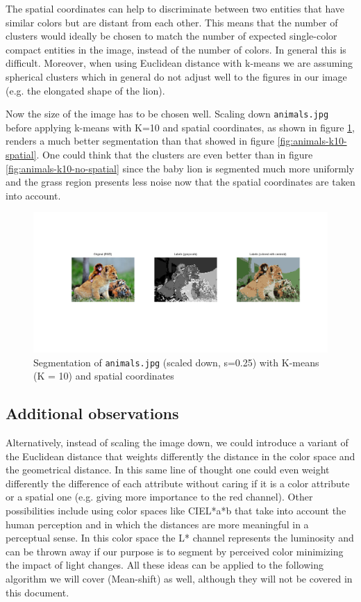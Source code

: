 The spatial coordinates can help to discriminate between two entities
that have similar colors but are distant from each other. This means that the number of
clusters would ideally be chosen to match the number of expected single-color compact
entities in the image, instead
of the number of colors. In general this is difficult.
Moreover, when using Euclidean distance with k-means
we are assuming spherical clusters which in general do not adjust well to the figures in
our image (e.g. the elongated shape of the lion).

Now the size of the image has to be chosen well. Scaling
down \texttt{animals.jpg} before applying k-means with K=10 and spatial coordinates,
as shown in figure
\ref{fig:animals-k10-spatial-scaled-down},
renders a much better segmentation than that showed in figure \ref{fig:animals-k10-spatial}.
One could think
that the clusters are even better than in figure \ref{fig:animals-k10-no-spatial} since
the baby lion is segmented much more uniformly and the grass region presents less noise now
that the spatial coordinates are taken into account.

\begin{figure}[hbt]
\centering
\includegraphics[trim={50px 150px 50px 125px},clip,width=\textwidth]{img/kmeans/animals_k10_scaled_down_spatial.png}
\caption{Segmentation of \texttt{animals.jpg} (scaled down, s=0.25) with K-means (K = 10) and spatial coordinates}
\label{fig:animals-k10-spatial-scaled-down}
\end{figure}

\subsection{Additional observations}

Alternatively, instead of scaling the image down, we could introduce a
variant of the Euclidean distance that weights differently the distance
in the color space and the geometrical distance. In this same line of thought one
could even weight differently the difference of each attribute without caring if
it is a color attribute or a spatial one (e.g. giving
more importance to the red channel). Other possibilities include using
color spaces like CIEL*a*b that take into account the human perception and in which
the distances are more meaningful in a perceptual sense. In this color space the
L* channel represents the luminosity and can be thrown away if our purpose is to
segment by perceived color minimizing
the impact of light changes. All these ideas can be applied to the following algorithm
we will cover (Mean-shift) as well, although they will not be covered in this document.

\FloatBarrier